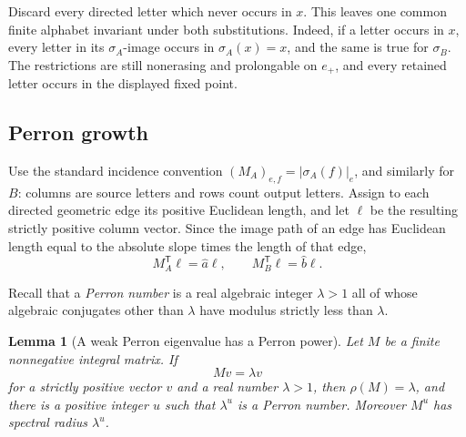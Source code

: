 \documentclass[11pt]{article}
\newtheorem{lemma}[theorem]{Lemma}
\theoremstyle{definition}
\theoremstyle{remark}
\begin{document}
Discard every directed letter which never occurs in \(x\).  This leaves one
common finite alphabet invariant under both substitutions.  Indeed, if a
letter occurs in \(x\), every letter in its \(\sigma_A\)-image occurs in
\(\sigma_A(x)=x\), and the same is true for \(\sigma_B\).  The restrictions
are still nonerasing and prolongable on \(e_+\), and every retained letter
occurs in the displayed fixed point.

\subsection{Perron growth}

Use the standard incidence convention
$(M_A)_{e,f}=|\sigma_A(f)|_e$, and similarly for $B$: columns are source
letters and rows count output letters.  Assign to each directed geometric
edge its positive Euclidean length, and let $\boldsymbol\ell$ be the
resulting strictly positive column vector.  Since the image path of an edge
has Euclidean length equal to the absolute slope times the length of that
edge,
\begin{equation}\label{term:eq:length-eigenvectors}
 M_A^{\mathsf T}\boldsymbol\ell=\widehat a\boldsymbol\ell,\qquad
 M_B^{\mathsf T}\boldsymbol\ell=\widehat b\boldsymbol\ell.
\end{equation}

Recall that a \emph{Perron number} is a real algebraic integer
\(\lambda>1\) all of whose algebraic conjugates other than \(\lambda\) have
modulus strictly less than \(\lambda\).

\begin{lemma}[A weak Perron eigenvalue has a Perron power]
\label{term:lem:perron-power}
Let \(M\) be a finite nonnegative integral matrix.  If
\[
 Mv=\lambda v
\]
for a strictly positive vector \(v\) and a real number \(\lambda>1\), then
\(\rho(M)=\lambda\), and there is a positive integer \(u\) such that
\(\lambda^u\) is a Perron number.  Moreover \(M^u\) has spectral radius
\(\lambda^u\).
\end{lemma}
\end{document}
